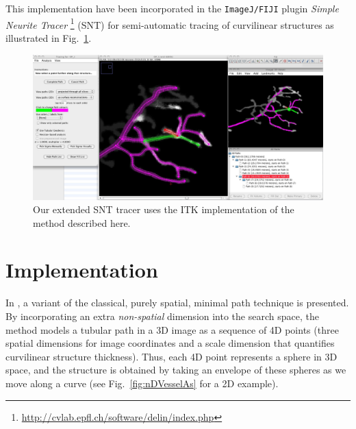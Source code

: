 \documentclass{InsightArticle}
\begin{document}
This implementation have been incorporated in the \texttt{ImageJ/FIJI} plugin \textit{Simple Neurite Tracer} \footnote{\url{http://cvlab.epfl.ch/software/delin/index.php}} (SNT) for semi-automatic tracing of curvilinear structures as illustrated in Fig.~\ref{fig:snt}.

\begin{figure}[!h]
\begin{center}		
\includegraphics[width=0.70\linewidth]{DemoTubularGeo1}
\end{center}
\vspace{-0.5cm}
\caption{Our extended SNT tracer uses the ITK implementation of the method described here.}
\label{fig:snt}
\end{figure}


\section{Implementation}

In \cite{Li07}, a variant of the classical, purely spatial, minimal path technique is presented. By incorporating an extra \textit{non-spatial} dimension into the search space, the method models a tubular path in a 3D image as a sequence of 4D points (three spatial dimensions for image coordinates and a scale dimension that quantifies curvilinear structure thickness). Thus, each 4D point represents a sphere in 3D space, and the structure is obtained by taking an envelope of these spheres as we move along a curve (see Fig.~\ref{fig:nDVesselAs} for a 2D example). 
\end{document}
